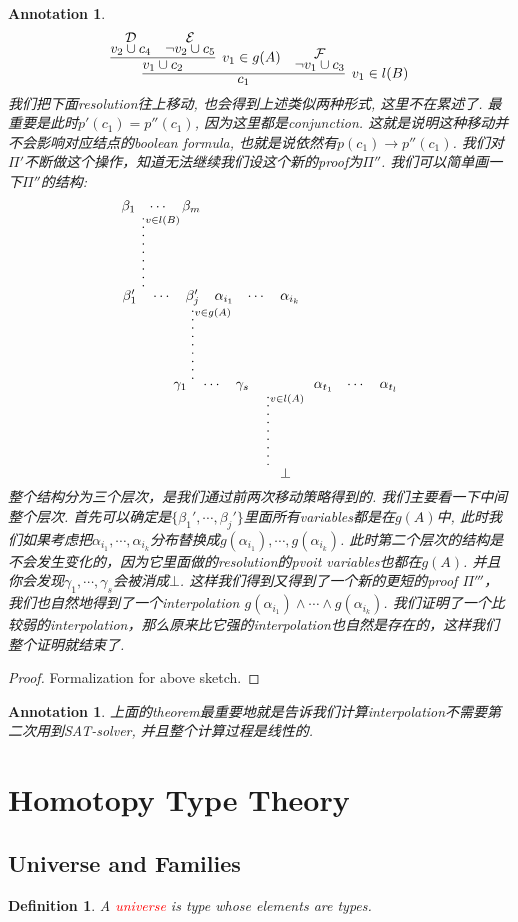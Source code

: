 \documentclass{article}
\newtheorem{definition}[theorem]{Definition}
\newtheorem{annotation}[theorem]{Annotation}
\newcommand{\redt}[1]{\textcolor{red}{#1}}
\begin{document}
\begin{annotation}
\[
	\infer[v_1 \in l(B)]{c_1}{\infer[v_1 \in g(A)]{v_1 \cup c_2}{\deduce{v_2 \cup c_4}{\mathcal{D}} & \deduce{\neg v_2 \cup c_5}{\mathcal{E}}} & \deduce{\neg v_1 \cup c_3}{\mathcal{F}}}
\]
我们把下面resolution往上移动, 也会得到上述类似两种形式, 这里不在累述了. 最重要是此时$p'(c_1) = p''(c_1)$, 因为这里都是conjunction. 这就是说明这种移动并不会影响对应结点的boolean formula, 也就是说依然有$p(c_1)\to p''(c_1)$. 我们对$\varPi'$不断做这个操作，知道无法继续我们设这个新的proof为$\varPi''$. 我们可以简单画一下$\varPi''$的结构:
\[
	\deduce[\lvdots^{v \in l(A)}]{\bot}{\deduce[\lvdots^{v \in g(A)}]{\gamma_1 \quad \cdots \quad \gamma_s}{\deduce[\lvdots^{v \in l(B)}]{\beta_1' \quad \cdots \quad \beta_j'}{\beta_1 & \cdots & \beta_m} & \alpha_{i_1} & \cdots & \alpha_{i_k}} & \alpha_{t_1} & \cdots & \alpha_{t_l}}
\]
整个结构分为三个层次，是我们通过前两次移动策略得到的. 我们主要看一下中间整个层次. 首先可以确定是$\{\beta_1',\cdots, \beta_j'\}$里面所有variables都是在$g(A)$中, 此时我们如果考虑把$\alpha_{i_1}, \cdots , \alpha_{i_k}$分布替换成$g(\alpha_{i_1}), \cdots,  g(\alpha_{i_k})$. 此时第二个层次的结构是不会发生变化的，因为它里面做的resolution的pvoit variables也都在$g(A)$. 并且你会发现${\gamma_1, \cdots, \gamma_s}$会被消成$\bot$. 这样我们得到又得到了一个新的更短的proof $\varPi'''$，我们也自然地得到了一个interpolation $g(\alpha_{i_1}) \wedge \cdots \wedge g(\alpha_{i_k})$. 我们证明了一个比较弱的interpolation，那么原来比它强的interpolation也自然是存在的，这样我们整个证明就结束了.
\end{annotation}

\begin{proof}
\rm Formalization for above sketch.
\end{proof}

\begin{annotation}
\rm 上面的theorem最重要地就是告诉我们计算interpolation不需要第二次用到SAT-solver, 并且整个计算过程是线性的. 
\end{annotation}

\newpage
\section{Homotopy Type Theory}

\subsection{Universe and Families}

\begin{definition}
\rm A \redt{universe} is type whose elements are types.
\end{definition}
\end{document}
